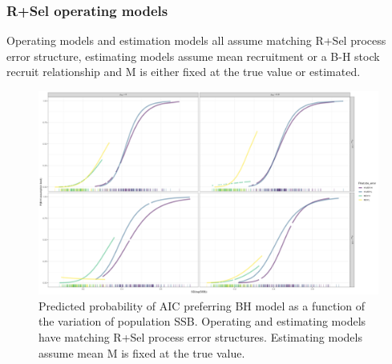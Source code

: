 \documentclass[
  12pt,
]{article}
\begin{document}
\hypertarget{rsel-operating-models-2}{%
\subsubsection*{R+Sel operating models}\label{rsel-operating-models-2}}

\begin{table}
\caption{Operating models and estimation models all assume matching R+Sel process error structure, estimating models assume mean recruitment or a B-H stock recruit relationship and M is either fixed at the true value or estimated.}
{}
\end{table}

\begin{figure}
\caption{Predicted probability of AIC preferring BH model as a function of the variation of population SSB. Operating and estimating models have matching R+Sel process error structures. Estimating models assume mean M is fixed at the true value.}\label{Sel_om_MF_BH_glm_AIC_plots}
\begin{center}
\includegraphics[width = \textwidth]{Sel_om_MF_pred_BH_best.png}
\end{center}
\end{figure}
\end{document}
